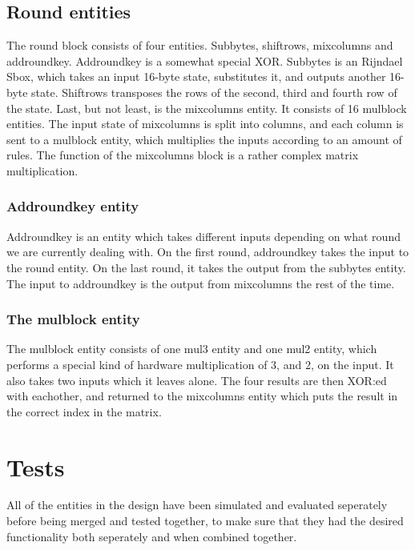 \subsection{Round entities}
The round block consists of four entities. Subbytes, shiftrows, mixcolumns and 
addroundkey. Addroundkey is a somewhat special XOR. Subbytes is an Rijndael 
Sbox, which takes an input 16-byte state, substitutes it, and outputs another 
16-byte state. Shiftrows transposes the rows of the second, third and fourth 
row of the state. Last, but not least, is the mixcolumns entity. It consists of 
16 mulblock entities. The input state of mixcolumns is split into columns, and 
each column is sent to a mulblock entity, which multiplies the inputs according 
to an amount of rules. The function of the mixcolumns block is a rather complex 
matrix multiplication.

\subsubsection{Addroundkey entity}
Addroundkey is an entity which takes different inputs depending on 
what round we are currently dealing with. On the first round, addroundkey takes 
the input to the round entity. On the last round, it takes the output from the 
subbytes entity. The input to addroundkey is the output from mixcolumns the rest 
of the time.

\subsubsection{The mulblock entity}
The mulblock entity consists of one mul3 entity and one mul2 entity, which 
performs a special kind of hardware multiplication of 3, and 2, on the input. It 
also takes two inputs which it leaves alone. The four results are then XOR:ed 
with eachother, and returned to the mixcolumns entity which puts the result in 
the correct index in the matrix.

\section{Tests}
All of the entities in the design have been simulated and evaluated seperately 
before being merged and tested together, to make sure that they had the desired 
functionality both seperately and when combined together. 


